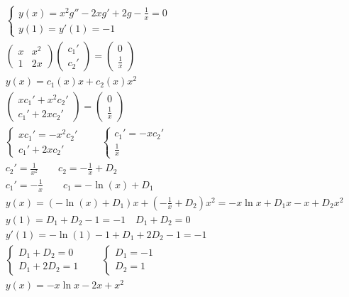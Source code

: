 	\begin{gather*}
	\begin{cases}
		y(x) = x^2 g'' - 2xg' + 2g - \frac{1}{x} = 0\\
		y(1) = y'(1) = -1
	\end{cases}\\
	\begin{pmatrix}
		x & x^2\\
		1 & 2x
	\end{pmatrix}
	\begin{pmatrix}
		c_1' \\ c_2'
	\end{pmatrix}
	=
	\begin{pmatrix}
		0 \\ \frac{1}{x}
	\end{pmatrix}\\
	y(x) = c_1(x)x + c_2(x)x^2\\
	\begin{pmatrix}
		xc_1' + x^2c_2' \\ c_1' + 2xc_2'
	\end{pmatrix}
	=
	\begin{pmatrix}
		0 \\ \frac{1}{x}
	\end{pmatrix}\\
	\begin{cases}
		xc_1' = -x^2c_2' \\ c_1' + 2xc_2'
	\end{cases}
	\qquad
	\begin{cases}
		c_1' = -xc_2' \\ \frac{1}{x}
	\end{cases}\\
	c_2' = \frac{1}{x^2}\qquad c_2 = -\frac{1}{x} + D_2\\
	c_1' = -\frac{1}{x}\qquad c_1 = -\ln(x) + D_1\\
	y(x) = (-\ln(x) + D_1)x + (-\frac{1}{x} + D_2)x^2 = -x\ln x + D_1 x - x + D_2 x^2\\
	y(1) = D_1 + D_2 - 1 = -1\quad D_1 + D_2 = 0\\
	y'(1) = -\ln(1) - 1 + D_1 + 2D_2 - 1 = -1\\
	\begin{cases}
		D_1 + D_2 = 0 \\ D_1 + 2D_2 = 1
	\end{cases}\qquad
	\begin{cases}
		D_1 = -1 \\ D_2 = 1
	\end{cases}\\
	y(x) = -x\ln x - 2x + x^2
	\end{gather*}
\vskip 0.4in


